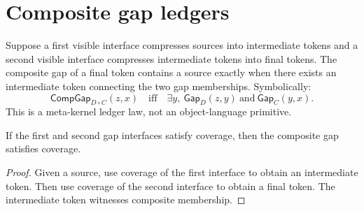 \section{Composite gap ledgers}

\begin{definition}
Suppose a first visible interface compresses sources into intermediate tokens and a second visible interface compresses intermediate tokens into final tokens.  The composite gap of a final token contains a source exactly when there exists an intermediate token connecting the two gap memberships.  Symbolically:
$$
\mathsf{CompGap}_{D\circ C}(z,x)
\quad\text{iff}\quad
\exists y,\ \mathsf{Gap}_D(z,y)\ \text{and}\ \mathsf{Gap}_C(y,x).
$$
This is a meta-kernel ledger law, not an object-language primitive.
\end{definition}

\begin{theorem}
\label{thm:proof-sprint-composite-gap-coverage}
If the first and second gap interfaces satisfy coverage, then the composite gap satisfies coverage.
\end{theorem}
\begin{proof}
Given a source, use coverage of the first interface to obtain an intermediate token.  Then use coverage of the second interface to obtain a final token.  The intermediate token witnesses composite membership.
\end{proof}

